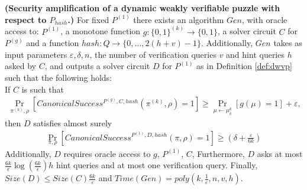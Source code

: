 \begin{lemma}\textbf{(Security amplification of a dynamic weakly verifiable puzzle with respect to $P_{hash}$.)}
  \label{lemma:sec_amp_for_p_hash}
  For fixed $P^{(1)}$ there exists an algorithm $Gen$, with oracle access to:
  $P^{(1)}$, a monotone function $g:\{0,1\}^{(k)} \rightarrow \{0,1\}$,
  a solver circuit $C$ for $P^{(g)}$ and a function $hash : Q \rightarrow \{0, \dots, 2(h+v)-1\}$.
  Additionally, $Gen$ takes as input parameters $\varepsilon, \delta, n$,
  the number of verification queries $v$ and hint queries $h$ asked by $C$,
  and outputs a solver circuit $D$ for $P^{(1)}$ as in Definition \ref{def:dwvp}
  such that the following holds: \\
  If $C$ is such that \\
  \begin{align*}
    \underset{\pi^{(k)}, \rho}{\Pr}\left[CanonicalSuccess^{P^{(g)}, C, hash}(\pi^{(k)}, \rho)=1\right] \geq \underset{\mu \leftarrow \mu_\delta^k}{\Pr}[g(\mu) = 1] + \varepsilon,
  \end{align*}
  then $D$ satisfies almost surely
  \begin{align*}
    \underset{\pi, \rho}{\Pr}\left[CanonicalSuccess^{P^{(1)}, D, hash}(\pi, \rho)=1\right] \geq (\delta + \frac{\varepsilon}{6k})
  \end{align*}
  Additionally, $D$ requires oracle access to $g$, $P^{(1)}$, $C$,
  Furthermore, $D$ asks at most $\frac{6k}{\epsilon}\log\left(\frac{6k}{\epsilon}\right) h$ hint queries and at most one verification query.
  Finally, $Size(D) \leq Size(C)\frac{6k}{\varepsilon}$ and $Time(Gen) = poly(k, \frac{1}{\varepsilon}, n, v, h)$.
\end{lemma}
%
